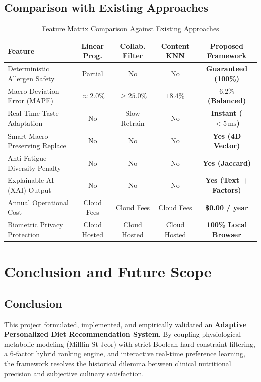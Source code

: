 \documentclass[12pt,a4paper]{report}
\begin{document}
\section{Comparison with Existing Approaches}

\begin{table}[htbp]
\centering
\caption{Feature Matrix Comparison Against Existing Approaches}
\label{tab:feature_comparison}
\small
\begin{tabularx}{\textwidth}{l c c c c}
\toprule
\textbf{Feature} & \textbf{Linear Prog.} & \textbf{Collab. Filter} & \textbf{Content KNN} & \textbf{Proposed Framework} \\
\midrule
Deterministic Allergen Safety & Partial & No & No & \textbf{Guaranteed (100\%)} \\
Macro Deviation Error (MAPE) & $\approx 2.0\%$ & $\ge 25.0\%$ & $18.4\%$ & \textbf{$6.2\%$ (Balanced)} \\
Real-Time Taste Adaptation & No & Slow Retrain & No & \textbf{Instant ($< 5\,\text{ms}$)} \\
Smart Macro-Preserving Replace & No & No & No & \textbf{Yes (4D Vector)} \\
Anti-Fatigue Diversity Penalty & No & No & No & \textbf{Yes (Jaccard)} \\
Explainable AI (XAI) Output & No & No & No & \textbf{Yes (Text + Factors)} \\
Annual Operational Cost & Cloud Fees & Cloud Fees & Cloud Fees & \textbf{\$0.00 / year} \\
Biometric Privacy Protection & Cloud Hosted & Cloud Hosted & Cloud Hosted & \textbf{100\% Local Browser} \\
\bottomrule
\end{tabularx}
\end{table}

\chapter{Conclusion and Future Scope}

\section{Conclusion}
This project formulated, implemented, and empirically validated an \textbf{Adaptive Personalized Diet Recommendation System}. By coupling physiological metabolic modeling (Mifflin-St Jeor) with strict Boolean hard-constraint filtering, a 6-factor hybrid ranking engine, and interactive real-time preference learning, the framework resolves the historical dilemma between clinical nutritional precision and subjective culinary satisfaction. 
\end{document}
